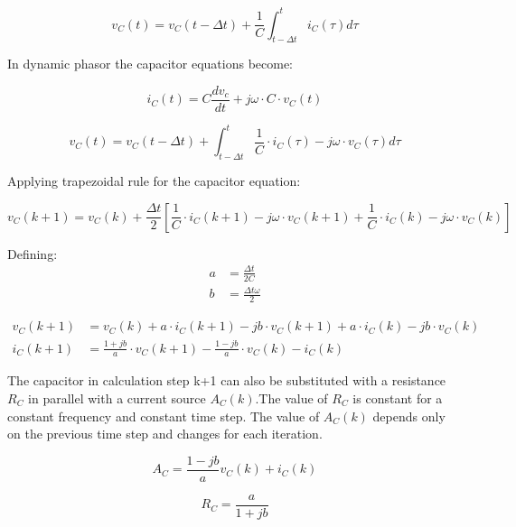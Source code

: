 \begin{equation}
	v_C(t)= v_C(t - \Delta t) + \frac{1}{C} \int_{t - \Delta t}^{t} i_C (\tau) d \tau
\end{equation}

In dynamic phasor the capacitor equations become:

\begin{equation}
        i_C(t)= C \frac{d v_c}{dt} + j \omega \cdot C \cdot v_C(t)
\end{equation}

\begin{equation}
        v_C(t) = v_C(t- \Delta t) +  \int_{t- \Delta t}^{t} \frac{1}{C} \cdot i_C(\tau) -j \omega \cdot v_C(\tau)d \tau 
\end{equation}

Applying trapezoidal rule for the capacitor equation:

\begin{equation}
        v_C(k+1) = v_C(k) + \frac{\Delta t}{2} \left[ \frac{1}{C} \cdot i_C(k+1) - j \omega \cdot v_C(k+1) + \frac{1}{C} \cdot i_C(k) - j \omega \cdot v_C(k) \right]
\end{equation}

Defining:
\begin{align}
        a &= \frac{\Delta t}{2C} \\
        b &= \frac{\Delta t \omega}{2}
\end{align}

\begin{align}
        v_C(k+1) &= v_C(k) + a \cdot i_C(k+1) - j b \cdot v_C(k+1) + a \cdot i_C(k) - j b \cdot v_C(k) \\
        i_C(k+1) &= \frac{1+jb}{a} \cdot v_C(k+1) - \frac{1-jb}{a} \cdot v_C(k) -i_C(k)
\end{align}

The capacitor in calculation step k+1 can also be substituted with a resistance $R_C$ in parallel with a current source $A_C(k)$.The value of $R_C$ is constant for a constant frequency and constant time step. The value of $A_C(k)$ depends only on the previous time step and changes for each iteration.

\begin{equation} \label{eq:AC}
	A_C = \frac{1-jb}{a} v_C(k) + i_C(k)
\end{equation}

\begin{equation}
	R_C = \frac{a}{1+jb}
\end{equation}

